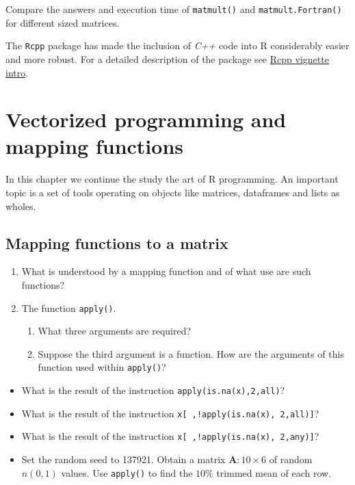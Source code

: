 \documentclass[
]{book}
\providecommand{\tightlist}{%
  \setlength{\itemsep}{0pt}\setlength{\parskip}{0pt}}
\begin{document}
Compare the answers and execution time of \texttt{matmult()} and \texttt{matmult.Fortran()} for different sized matrices.

The \texttt{Rcpp} package has made the inclusion of \emph{{C++}} code into R considerably easier and more robust. For a detailed description of the package see \href{https://cran.r-project.org/web/packages/Rcpp/vignettes/Rcpp-introduction.pdf}{Rcpp vignette intro}.

\chapter{Vectorized programming and mapping functions}\label{mapping}

In this chapter we continue the study the art of R programming. An important topic is a set of tools operating on objects like matrices, dataframes and lists as wholes.

\section{Mapping functions to a matrix}\label{mapping-functions-to-a-matrix}

\begin{enumerate}
\def\labelenumi{(\alph{enumi})}
\item
  What is understood by a mapping function and of what use are such functions?
\item
  The function \texttt{apply()}.

  \begin{enumerate}
  \def\labelenumii{(\roman{enumii})}
  \item
    What three arguments are required?
  \item
    Suppose the third argument is a function. How are the arguments of this function used within \texttt{apply()}?
  \end{enumerate}
\end{enumerate}

\begin{itemize}
\item
  What is the result of the instruction \texttt{apply(is.na(x),2,all)}?
\item
  What is the result of the instruction \texttt{x{[}\ ,!apply(is.na(x),\ 2,all){]}}?
\item
  What is the result of the instruction \texttt{x{[}\ ,!apply(is.na(x),\ 2,any){]}}?
\end{itemize}

\begin{itemize}
\tightlist
\item
  Set the random seed to 137921. Obtain a matrix \(\mathbf{A}:10 \times 6\) of random \(n(0, 1)\) values. Use \texttt{apply()} to find the \(10\%\) trimmed mean of each row.
\end{itemize}
\end{document}
